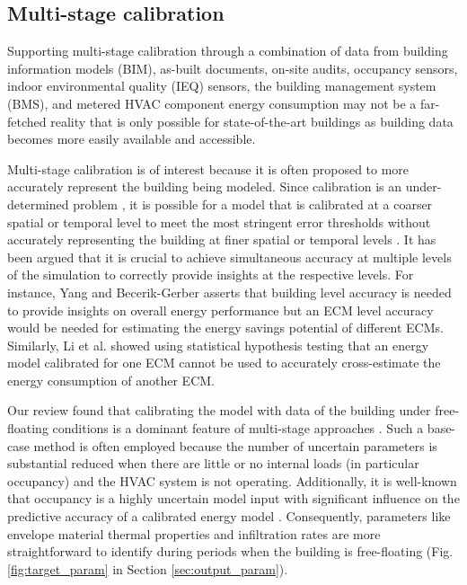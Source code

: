 \documentclass[review]{elsarticle}
\begin{document}
\subsection{Multi-stage calibration} \label{sec:multi-stage}

Supporting multi-stage calibration through a combination of data from building information models (BIM), as-built documents, on-site audits, occupancy sensors, indoor environmental quality (IEQ) sensors, the building management system (BMS), and metered HVAC component energy consumption may not be a far-fetched reality that is only possible for state-of-the-art buildings as building data becomes more easily available and accessible.

Multi-stage calibration is of interest because it is often proposed to more accurately represent the building being modeled. Since calibration is an under-determined problem \cite{chong2018guidelines}, it is possible for a model that is calibrated at a coarser spatial or temporal level to meet the most stringent error thresholds without accurately representing the building at finer spatial or temporal levels \cite{zuhaib2019application, yin2016linking, raftery2011calibrating}. It has been argued that it is crucial to achieve simultaneous accuracy at multiple levels of the simulation to correctly provide insights at the respective levels. For instance, Yang and Becerik-Gerber \cite{yang2015model} asserts that building level accuracy is needed to provide insights on overall energy performance but an ECM level accuracy would be needed for estimating the energy savings potential of different ECMs. Similarly, Li et al. \cite{li2015why} showed using statistical hypothesis testing that an energy model calibrated for one ECM cannot be used to accurately cross-estimate the energy consumption of another ECM. 

Our review found that calibrating the model with data of the building under free-floating conditions is a dominant feature of multi-stage approaches \cite{cipriano2015evaluation, aparicio-fernandez2019energy, cacabelos2017development, ferrara2020optimizing}. Such a base-case method is often employed because the number of uncertain parameters is substantial reduced when there are little or no internal loads (in particular occupancy) and the HVAC system is not operating. Additionally, it is well-known that occupancy is a highly uncertain model input \cite{yan2015occupant} with significant influence on the predictive accuracy of a calibrated energy model \cite{li2015why, kim2017building, chong2021occupancy}. Consequently, parameters like envelope material thermal properties and infiltration rates are more straightforward to identify during periods when the building is free-floating (Fig. \ref{fig:target_param} in Section \ref{sec:output_param}). 
\end{document}
